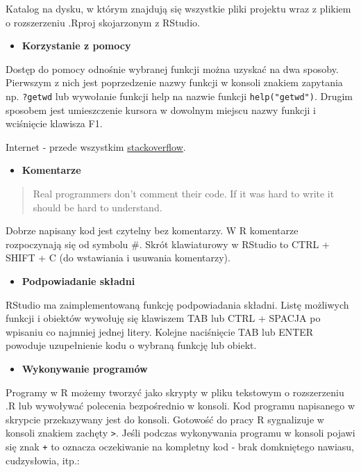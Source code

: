 \documentclass[]{book}
\providecommand{\tightlist}{%
  \setlength{\itemsep}{0pt}\setlength{\parskip}{0pt}}
\begin{document}
Katalog na dysku, w którym znajdują się wszystkie pliki projektu wraz z
plikiem o rozszerzeniu .Rproj skojarzonym z RStudio.

\begin{itemize}
\tightlist
\item
  \textbf{Korzystanie z pomocy}
\end{itemize}

Dostęp do pomocy odnośnie wybranej funkcji można uzyskać na dwa sposoby.
Pierwszym z nich jest poprzedzenie nazwy funkcji w konsoli znakiem
zapytania np. \texttt{?getwd} lub wywołanie funkcji help na nazwie
funkcji \texttt{help("getwd")}. Drugim sposobem jest umieszczenie
kursora w dowolnym miejscu nazwy funkcji i wciśnięcie klawisza F1.

Internet - przede wszystkim
\href{https://stackoverflow.com/questions/tagged/r}{stackoverflow}.

\begin{itemize}
\tightlist
\item
  \textbf{Komentarze}
\end{itemize}

\begin{quote}
Real programmers don't comment their code. If it was hard to write it
should be hard to understand.
\end{quote}

Dobrze napisany kod jest czytelny bez komentarzy. W R komentarze
rozpoczynają się od symbolu \#. Skrót klawiaturowy w RStudio to CTRL +
SHIFT + C (do wstawiania i usuwania komentarzy).

\begin{itemize}
\tightlist
\item
  \textbf{Podpowiadanie składni}
\end{itemize}

RStudio ma zaimplementowaną funkcję podpowiadania składni. Listę
możliwych funkcji i obiektów wywołuję się klawiszem TAB lub CTRL +
SPACJA po wpisaniu co najmniej jednej litery. Kolejne naciśnięcie TAB
lub ENTER powoduje uzupełnienie kodu o wybraną funkcję lub obiekt.

\begin{itemize}
\tightlist
\item
  \textbf{Wykonywanie programów}
\end{itemize}

Programy w R możemy tworzyć jako skrypty w pliku tekstowym o
rozszerzeniu .R lub wywoływać polecenia bezpośrednio w konsoli. Kod
programu napisanego w skrypcie przekazywany jest do konsoli. Gotowość do
pracy R sygnalizuje w konsoli znakiem zachęty \texttt{\textgreater{}}.
Jeśli podczas wykonywania programu w konsoli pojawi się znak \texttt{+}
to oznacza oczekiwanie na kompletny kod - brak domkniętego nawiasu,
cudzysłowia, itp.:
\end{document}
